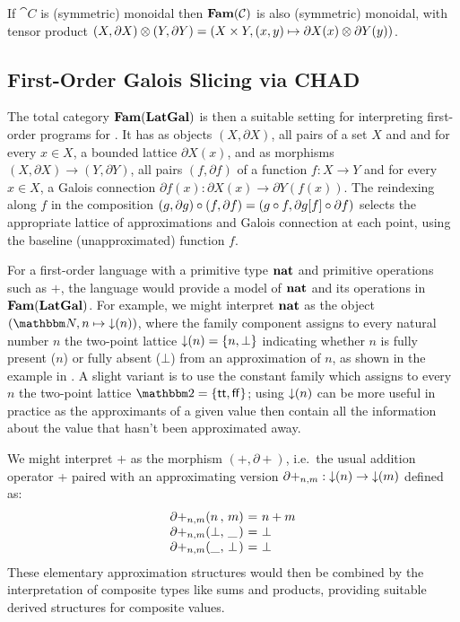 \begin{proposition}
\label{prop:Grothendieck:fam-inherits-products}
If $\cat{C}$ is (symmetric) monoidal then $\mathbf{Fam}(\mathcal{C})$ is also (symmetric) monoidal, with tensor product
$(X, \partial X) \otimes (Y, \partial Y) = (X \times Y,(x, y) \mapsto \partial X(x) \otimes \partial Y(y))$.
\end{proposition}

\subsection{First-Order Galois Slicing via CHAD}
\label{sec:fam:galois-slicing}

The total category $\mathbf{Fam}(\mathbf{LatGal})$ is then a suitable setting for interpreting first-order programs for \GPS.
It has as objects $(X, \partial X)$, all pairs of a set $X$ and and for every $x \in X$, a bounded lattice
$\partial X(x)$, and as morphisms $(X, \partial X) \to (Y, \partial Y)$, all pairs $(f, \partial f)$ of a
function $f: X \to Y$ and for every $x \in X$, a Galois connection $\partial f(x): \partial X(x) \to \partial
Y(f(x))$. The reindexing along $f$ in the composition $(g, \partial g) \circ (f, \partial f) = (g \circ f,
\partial g[f] \circ \partial f)$ selects the appropriate lattice of approximations and Galois
connection at each point, using the baseline (unapproximated) function $f$.

For a first-order language with a primitive type $\mathbf{nat}$ and primitive operations such as $+$, the
language would provide a model of $\mathbf{nat}$ and its operations in $\mathbf{Fam}(\mathbf{LatGal})$. For example, we might
interpret $\mathbf{nat}$ as the object $(\Nat,n \mapsto \downset{n})$, where the family component assigns to
every natural number $n$ the two-point lattice $\mathop{\downarrow}(n) = \{n, \bot\}$ indicating whether $n$ is fully
present ($n$) or fully absent ($\bot$) from an approximation of $n$, as shown in the example in
. A slight variant is to use the constant family which assigns to every $n$ the two-point
lattice $\Two = \{\mathsf{tt},\mathsf{ff}\}$; using $\mathop{\downarrow}(n)$ can be more useful in practice as the
approximants of a given value then contain all the information about the value that hasn't been approximated
away.

We might interpret $+$ as the morphism $(+,\partial+)$, i.e.~the usual addition operator + paired with an
approximating version $\partial+_{n,m}: \mathop{\downarrow}(n) \to \mathop{\downarrow}(m)$ defined as:
\begin{displaymath}
    \begin{array}[t]{l@{(}l@{,~}l@{)~}c@{~}l}
      \partial+_{n,m}&n&m&=&n + m \\
      \partial+_{n,m}&\bot&\_&=&\bot \\
      \partial+_{n,m}&\_&\bot&=&\bot
    \end{array}
\end{displaymath}
These elementary approximation structures would then be combined by the interpretation of composite types like
sums and products, providing suitable derived structures for composite values.

